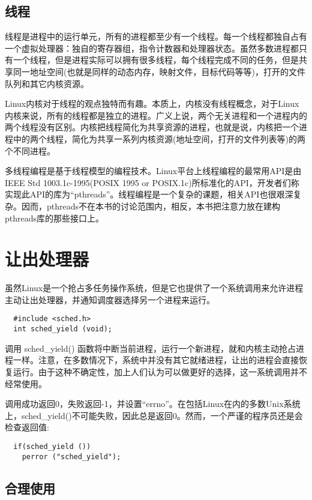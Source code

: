 \subsection{线程}

线程是进程中的运行单元，所有的进程都至少有一个线程。每一个线程都独自占有一个虚拟处理器：独自的寄存器组，指令计数器和处理器状态。虽然多数进程都只有一个线程，但是进程实际可以拥有很多线程，每个线程完成不同的任务，但是共享同一地址空间(也就是同样的动态内存，映射文件，目标代码等等)，打开的文件队列和其它内核资源。

Linux内核对于线程的观点独特而有趣。本质上，内核没有线程概念，对于Linux内核来说，所有的线程都是独立的进程。广义上说，两个无关进程和一个进程内的两个线程没有区别。内核把线程简化为共享资源的进程，也就是说，内核把一个进程中的两个线程，简化为共享一系列内核资源(地址空间，打开的文件列表等)的两个不同进程。

多线程编程是基于线程模型的编程技术。Linux平台上线程编程的最常用API是由IEEE Std 1003.1c-1995(POSIX 1995 or POSIX.1c)所标准化的API，开发者们称实现此API的库为“pthreads”。线程编程是一个复杂的课题，相关API也很艰深复杂。因而，pthreads不在本书的讨论范围内，相反，本书把注意力放在建构pthreads库的那些接口上。

\section{让出处理器}

虽然Linux是一个抢占多任务操作系统，但是它也提供了一个系统调用来允许进程主动让出处理器，并通知调度器选择另一个进程来运行。
\begin{lstlisting}
  #include <sched.h>
  int sched_yield (void);
\end{lstlisting}

调用 sched\_yield() 函数将中断当前进程，运行一个新进程，就和内核主动抢占进程一样。注意，在多数情况下，系统中并没有其它就绪进程，让出的进程会直接恢复运行。由于这种不确定性，加上人们认为可以做更好的选择，这一系统调用并不经常使用。

调用成功返回0，失败返回-1，并设置“errno”。在包括Linux在内的多数Unix系统上，sched\_yield()不可能失败，因此总是返回0。然而，一个严谨的程序员还是会检查返回值:

\begin{lstlisting}
  if(sched_yield ())
    perror ("sched_yield");
\end{lstlisting}

\subsection{合理使用}

